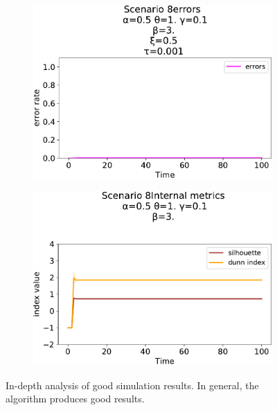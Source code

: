 \begin{figure}[!ht]
\begin{subfigure}[b]{0.32\textwidth}
    \includegraphics[width=\textwidth]{papers/swarm-intelligence2021/img/simulations/failScenario_0_08_α-0.5_θ-1._γ-0.1_β-3._ω-0._ζ-0._ξ-0.5_τ-0.001}
  \end{subfigure}
  \hfill
  \begin{subfigure}[b]{0.32\textwidth}
    \centering
    \includegraphics[width=\textwidth]{papers/swarm-intelligence2021/img/simulations/failScenario_0_0910_α-0.5_θ-1._γ-0.1_β-3._ω-0._ζ-0._ξ-0.5_τ-0.001}
  \end{subfigure}
  \caption[In-depth analysis of good clustering results.]{In-depth analysis of good simulation results. 
  In general, the algorithm produces good results. 
  }
  
  \label{fig:good-simulation-results}
\end{figure}